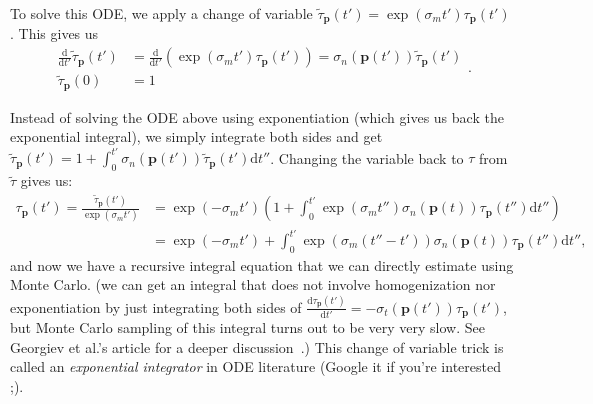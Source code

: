 To solve this ODE, we apply a change of variable $\tilde{\tau}_{\mathbf{p}}(t') = \exp\left(\sigma_m t'\right) \tau_{\mathbf{p}}(t')$. This gives us
\begin{equation}
\begin{aligned}
\frac{\mathrm{d}}{\mathrm{d}t'}\tilde{\tau}_{\mathbf{p}}(t') &= \frac{\mathrm{d}}{\mathrm{d}t'}\left(\exp\left(\sigma_m t'\right) \tau_{\mathbf{p}}(t')\right) = \sigma_n(\mathbf{p}(t')) \tilde{\tau}_{\mathbf{p}}(t') \\
\tilde{\tau}_{\mathbf{p}}(0) &= 1
\end{aligned}.
\end{equation}

Instead of solving the ODE above using exponentiation (which gives us back the exponential integral), we simply integrate both sides and get $\tilde{\tau}_{\mathbf{p}}(t') = 1 + \int_0^{t'} \sigma_n(\mathbf{p}(t')) \tilde{\tau}_{\mathbf{p}}(t') \mathrm{d}t''$. Changing the variable back to $\tau$ from $\tilde{\tau}$ gives us:
\begin{equation}
\begin{aligned}
\tau_{\mathbf{p}}(t') = \frac{\tilde{\tau}_{\mathbf{p}}(t')}{\exp\left(\sigma_m t'\right)} &= \exp\left(-\sigma_m t'\right) \left(1 + \int_{0}^{t'} \exp\left(\sigma_m t''\right) \sigma_n(\mathbf{p}(t)) \tau_{\mathbf{p}}(t'') \mathrm{d}t'' \right) \\
&= \exp\left(-\sigma_m t'\right) + \int_{0}^{t'} \exp\left(\sigma_m (t''-t')\right) \sigma_n(\mathbf{p}(t)) \tau_{\mathbf{p}}(t'') \mathrm{d}t'',
\end{aligned}
\label{eq:transmittance_recursive_integral}
\end{equation}
and now we have a recursive integral equation that we can directly estimate using Monte Carlo. (we can get an integral that does not involve homogenization nor exponentiation by just integrating both sides of $\frac{\mathrm{d}\tau_\mathbf{p}\left(t'\right)}{\mathrm{d}t'} = -\sigma_t(\mathbf{p}(t'))\tau_\mathbf{p}\left(t'\right)$, but Monte Carlo sampling of this integral turns out to be very very slow. See Georgiev et al.'s article for a deeper discussion~\cite{Georgiev:2019:IFV}.) This change of variable trick is called an \emph{exponential integrator} in ODE literature (Google it if you're interested ;).

